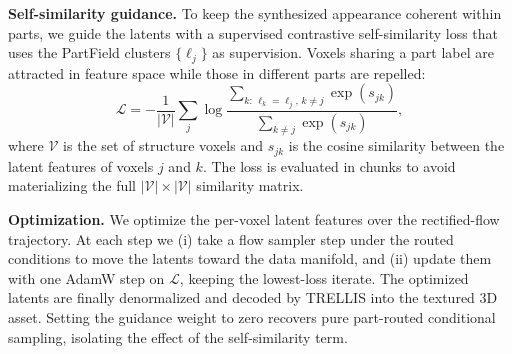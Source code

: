 \noindent\textbf{Self-similarity guidance.}
To keep the synthesized appearance coherent within parts, we guide the latents with a supervised contrastive self-similarity loss that uses the PartField clusters $\{\ell_j\}$ as supervision. Voxels sharing a part label are attracted in feature space while those in different parts are repelled:
\vspace{-1mm}
\begin{equation}
\mathcal{L} = -\frac{1}{|\mathcal{V}|}\sum_{j} \log \frac{\sum_{k:\,\ell_k=\ell_j,\,k\neq j}\exp(s_{jk})}{\sum_{k\neq j}\exp(s_{jk})},
\label{eq:contrastive}
\end{equation}
where $\mathcal{V}$ is the set of structure voxels and $s_{jk}$ is the cosine similarity between the latent features of voxels $j$ and $k$. The loss is evaluated in chunks to avoid materializing the full $|\mathcal{V}|\times|\mathcal{V}|$ similarity matrix.

\noindent\textbf{Optimization.}
We optimize the per-voxel latent features over the rectified-flow trajectory. At each step we (i) take a flow sampler step under the routed conditions to move the latents toward the data manifold, and (ii) update them with one AdamW step on $\mathcal{L}$, keeping the lowest-loss iterate. The optimized latents are finally denormalized and decoded by TRELLIS into the textured 3D asset. Setting the guidance weight to zero recovers pure part-routed conditional sampling, isolating the effect of the self-similarity term.








